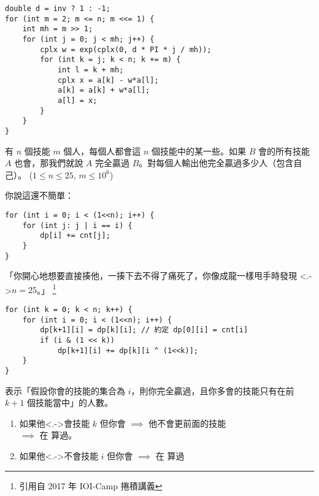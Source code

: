\documentclass[standalone]{beamer}
\begin{document}
\begin{frame}[fragile]
  \begin{verbatim}
double d = inv ? 1 : -1;
for (int m = 2; m <= n; m <<= 1) {
    int mh = m >> 1;
    for (int j = 0; j < mh; j++) {
        cplx w = exp(cplx(0, d * PI * j / mh));
        for (int k = j; k < n; k += m) {
            int l = k + mh;
            cplx x = a[k] - w*a[l];
            a[k] = a[k] + w*a[l];
            a[l] = x;
        }
    }
}
  \end{verbatim}
\end{frame}

\begin{frame}[fragile]
  \begin{problem}[經典問題]
    有 $n$ 個技能 $m$ 個人，每個人都會這 $n$ 個技能中的某一些。如果 $B$ 會的所有技能 $A$
    也會，那我們就說 $A$ 完全贏過 $B$。對每個人輸出他完全贏過多少人（包含自己）。
    ($1 \leq n \leq 25$, $m \leq 10^6$)
  \end{problem}
  \pause \disskip
  你說這還不簡單： \disskip
  \begin{verbatim}
for (int i = 0; i < (1<<n); i++) {
    for (int j: j | i == i) {
        dp[i] += cnt[j];
    }
}
\end{verbatim}
\pause \disskip
「你開心地想要直接揍他，一揍下去不得了痛死了，你像成龍一樣甩手時發現 \alert<.->{$n = 25$}。」
\footnote{引用自 2017 年 IOI-Camp 捲積講義}
\end{frame}

\begin{frame}[fragile]
  \begin{verbatim}
for (int k = 0; k < n; k++) {
    for (int i = 0; i < (1<<n); i++) {
        dp[k+1][i] = dp[k][i]; // 約定 dp[0][i] = cnt[i]
        if (i & (1 << k))
            dp[k+1][i] += dp[k][i ^ (1<<k)];
    }
}
\end{verbatim}
\pause \disskip
{} 表示「假設你會的技能的集合為 $i$，則你完全贏過，且你多會的技能只有在前 $k+1$ 個技能當中」的人數。
\pause
\disskip
\begin{enumerate}[<+->]
  \item 如果他\alert<.->{會}技能 $k$ 但你會 $\implies$ 他不會更前面的技能 \\
    $\implies$ 在  算過。
  \item 如果他\alert<.->{不會}技能 $i$ 但你會 $\implies$ 在 算過
\end{enumerate}
\end{frame}
\end{document}

